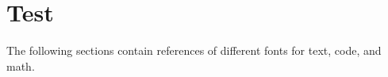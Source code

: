 \chapter{Test}
\label{chap:test}

The following sections contain references of different fonts for text, code, and
math. 




